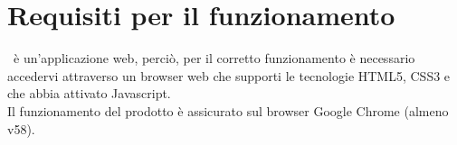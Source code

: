 \documentclass[../ManualeUtente.tex]{subfiles}
\begin{document}
	\section{Requisiti per il funzionamento}
		\progetto\ è un'applicazione web, perciò, per il corretto funzionamento
		è necessario accedervi attraverso un browser web che supporti le
		tecnologie HTML5, CSS3 e che abbia attivato Javascript.\\
		Il funzionamento del prodotto è assicurato sul browser Google Chrome (almeno v58).
\end{document}

